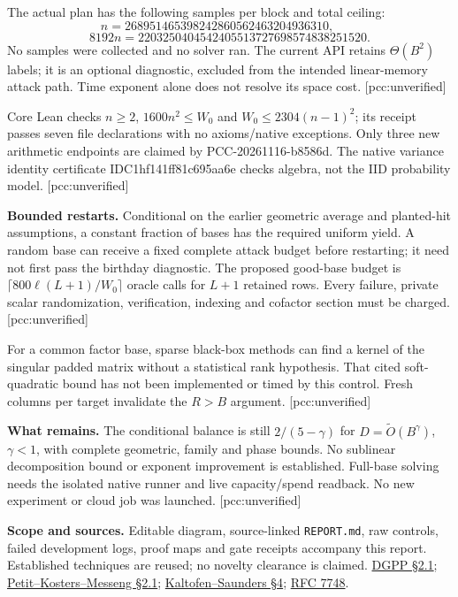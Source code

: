 \documentclass[10pt]{article}
\begin{document}
The actual plan has the following samples per block and total ceiling:
\[
n=268951465398242860562463204936310,\qquad
\]
\[
8192n=2203250404542405513727698574838251520.
\]
No samples were
collected and no solver ran. The current API retains $\Theta(B^2)$ labels;
it is an optional diagnostic, excluded from the intended linear-memory attack
path. Time exponent alone does not resolve its space cost. [pcc:unverified]

Core Lean checks $n\ge2$, $1600n^2\le W_0$ and
$W_0\le2304(n-1)^2$; its receipt passes seven file declarations with no
axioms/native exceptions. Only three new arithmetic endpoints are claimed
by PCC-20261116-b8586d. The native variance identity certificate
IDC1hf141ff81c695aa6e checks algebra, not the IID probability model.
[pcc:unverified]

\textbf{Bounded restarts.}
Conditional on the earlier geometric average and planted-hit assumptions,
a constant fraction of bases has the required uniform yield. A random base
can receive a fixed complete attack budget before restarting; it need not
first pass the birthday diagnostic. The proposed good-base budget is
$\lceil800\ell(L+1)/W_0\rceil$ oracle calls for $L+1$ retained rows.
Every failure, private scalar randomization, verification, indexing and
cofactor section must be charged. [pcc:unverified]

For a common factor base, sparse black-box methods can find a kernel of the
singular padded matrix without a statistical rank hypothesis. That cited
soft-quadratic bound has not been implemented or timed by this control.
Fresh columns per target invalidate the $R>B$ argument. [pcc:unverified]

\textbf{What remains.}
The conditional balance is still $2/(5-\gamma)$ for
$D=\widetilde O(B^\gamma)$, $\gamma<1$, with complete geometric, family and
phase bounds. No sublinear decomposition bound or exponent improvement is
established. Full-base solving needs the isolated native runner and live
capacity/spend readback. No new experiment or cloud job was launched.
[pcc:unverified]

\textbf{Scope and sources.}
Editable diagram, source-linked \texttt{REPORT.md}, raw controls, failed
development logs, proof maps and gate receipts accompany this report.
Established techniques are reused; no novelty clearance is claimed.
\href{https://arxiv.org/abs/1611.03579}{DGPP \S2.1};
\href{https://people.maths.ox.ac.uk/petit/files/16PKC_primeECDLP.pdf}{Petit--Kosters--Messeng \S2.1};
\href{https://users.cs.duke.edu/~elk27/bibliography/91/KaSa91.pdf}{Kaltofen--Saunders \S4};
\href{https://www.rfc-editor.org/rfc/rfc7748}{RFC 7748}.
\end{document}

